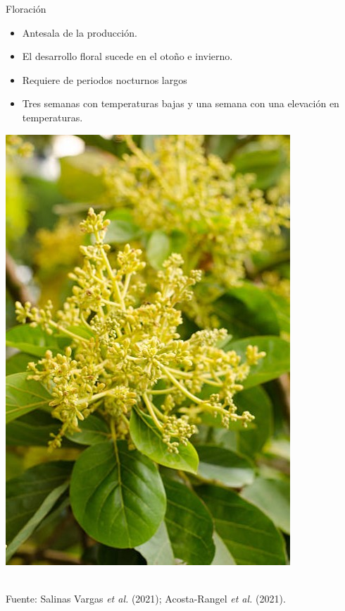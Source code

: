 \documentclass[aspectratio=169]{beamer}
\begin{document}
\begin{frame}{Floración}
    \vspace{-1cm}
		\begin{minipage}{0.5\textwidth}
            \begin{block}{}
                \begin{itemize}
				\item Antesala de la producción.
                    \item El desarrollo floral sucede en el otoño e invierno.
                    \item Requiere de periodos nocturnos largos
                    \item Tres semanas con temperaturas bajas y una semana con una elevación en temperaturas. 
			\end{itemize}
            \end{block}
		\end{minipage}%
        \begin{minipage}{0.5\textwidth}
        \centering
\includegraphics[height=0.7\textheight ]{images/Floración.jpg}
		\end{minipage}%
        \,\\
        \hfill {\scriptsize Fuente: Salinas Vargas \textit{et al.} (2021); Acosta-Rangel \textit{et al.} (2021).}
\end{frame}
\end{document}
